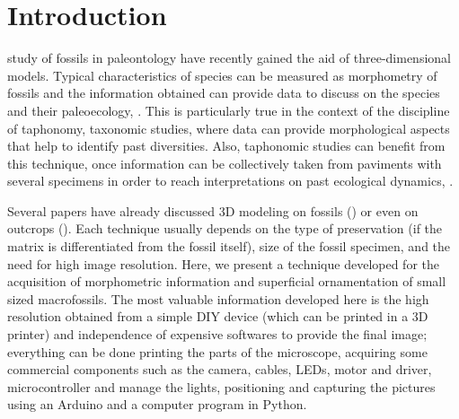 \documentclass[journal]{IEEEtran}
\begin{document}
\section{Introduction}
% 
% 
% 
% 
 study of fossils in paleontology have recently gained the aid of three-dimensional models. Typical characteristics of species can be measured as morphometry of fossils and the information obtained can provide data to discuss on the species and their paleoecology, \cite{Mallison2014}. This is particularly true in the context of the discipline of taphonomy, taxonomic studies, where data can provide morphological aspects that help to identify past diversities. Also, taphonomic studies can benefit from this technique, once information can be collectively taken from paviments with several specimens in order to reach interpretations on past ecological dynamics, \cite{Falkingham2012}.

Several papers have already discussed 3D modeling on fossils (\cite{Sutton2001,Caracuel2002,Falkingham2012,Falkingham2013,Hamm2018,Valverde-bastidas2020}) or even on outcrops (\cite{Caracuel2000,Cruzado-caballero2019}). Each technique usually depends on the type of preservation (if the matrix is differentiated from the fossil itself), size of the fossil specimen, and the need for high image resolution. Here, we present a technique developed for the acquisition of morphometric information and superficial ornamentation of small sized macrofossils. The most valuable information developed here is the high resolution obtained from a simple DIY device (which can be printed in a 3D printer) and independence of expensive softwares to provide the final image; everything can be done printing the parts of the microscope, acquiring some commercial components such as the camera, cables, LEDs, motor and driver, microcontroller and manage the lights, positioning and capturing the pictures using an Arduino and a computer program in Python. 


\end{document}
